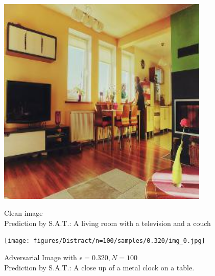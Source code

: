 \begin{figure}[ht]
    \centering
    \begin{minipage}{0.45\textwidth}
        \centering
        \includegraphics[width=0.9\textwidth]{figures/Distract/n=100/samples/0.000/img_0.jpg} %
        \caption*{Clean image\\Prediction by S.A.T.: A living room with a television and a couch}
    \end{minipage}\hfill
    \begin{minipage}{0.45\textwidth}
        \centering
        \texttt{[image: figures/Distract/n=100/samples/0.320/img\_0.jpg]} %
        \caption*{Adversarial Image with $\epsilon=0.320, N=100$\\Prediction by S.A.T.: A close up of a metal clock on a table.}
    \end{minipage}
\end{figure}


